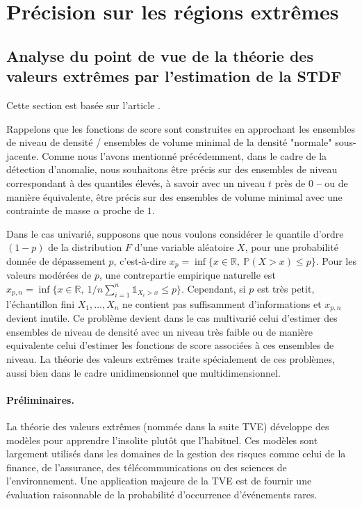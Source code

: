 \section{Précision sur les régions extrêmes}
\label{resume_fr:extreme}
\subsection{Analyse du point de vue de la théorie des valeurs extrêmes par l'estimation de la STDF}
\label{resume_fr:stdf}
Cette section est basée sur l'article \cite{COLT15}.

Rappelons que les fonctions de score sont construites en approchant les ensembles de niveau de densité / ensembles de volume minimal de la densité "normale" sous-jacente. Comme nous l'avons mentionné précédemment, dans le cadre de la détection d'anomalie, nous souhaitons être précis sur des ensembles de niveau correspondant à des quantiles élevés, à savoir avec un niveau $ t $ près de $ 0 $ -- ou de manière équivalente, être précis sur des ensembles de volume minimal avec une contrainte de masse $ \alpha $ proche de $ 1 $.

%
Dans le cas univarié, supposons que nous voulons considérer le quantile d'ordre $(1-p)$ de la distribution $ F $ d'une variable aléatoire $ X $, pour une probabilité donnée de dépassement $ p $, c'est-à-dire
 $x_p = \inf\{x \in \mathbb{R},~ \mathbb{P}(X > x) \le p\}$. 
Pour les valeurs modérées de $ p $, une contrepartie empirique naturelle est
 $x_{p,n} = \inf\{x \in \mathbb{R},~ 1/n \sum_{i=1}^n \mathds{1}_{X_i > x}\le p\}$.
Cependant, si $ p $ est très petit, l'échantillon fini $ X_1, \ldots, X_n $ ne contient pas suffisamment d'informations et $ x_ {p, n} $ devient inutile.
%
Ce problème devient dans le cas multivarié celui d'estimer des ensembles de niveau de densité avec un niveau très faible ou de manière equivalente celui d'estimer les fonctions de score associées à ces ensembles de niveau.
%
La théorie des valeurs extrêmes traite spécialement de ces problèmes, aussi bien dans le cadre unidimensionnel que multidimensionnel.
%


\paragraph{Préliminaires.}
La théorie des valeurs extrêmes (nommée dans la suite \textsc {TVE}) développe des modèles pour apprendre l'insolite plutôt que l'habituel. Ces modèles sont largement utilisés dans les domaines de la gestion des risques comme celui de la finance, de l'assurance, des télécommunications ou des sciences de l'environnement. Une application majeure de la \textsc{TVE} est de fournir une évaluation raisonnable de la probabilité d'occurrence d'événements rares.

